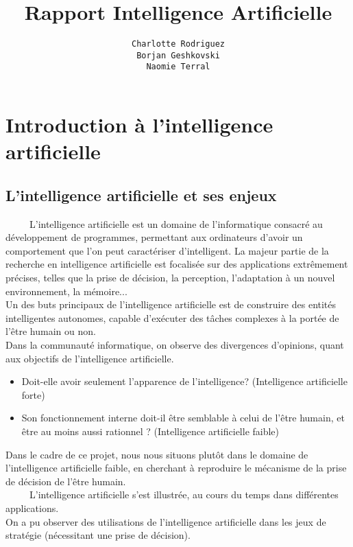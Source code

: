 \documentclass[a4paper,12pt]{report}
\begin{document}
\title{Rapport Intelligence Artificielle}

\author{\texttt{Charlotte Rodriguez}\\
		\texttt{Borjan Geshkovski}\\
		\texttt{Naomie Terral}
		}
\maketitle

\section{Introduction à l'intelligence artificielle}

\subsection{L'intelligence artificielle et ses enjeux}
\ \ \ \ \ L'intelligence artificielle est un domaine de l'informatique consacré au développement de programmes, permettant aux ordinateurs d'avoir un comportement que l'on peut caractériser d'intelligent. La majeur partie de la recherche en intelligence artificielle est focalisée sur des applications extrêmement précises, telles que la prise de décision, la perception, l'adaptation à un nouvel environnement, la mémoire... \\
Un des buts principaux de l'intelligence artificielle est de construire des entités intelligentes autonomes, capable d'exécuter des tâches complexes à la portée de l'être humain ou non. \\ 
Dans la communauté informatique, on observe des divergences d'opinions, quant aux objectifs de l'intelligence artificielle. 
\begin{itemize}
\item Doit-elle avoir seulement l'apparence de l'intelligence? (Intelligence artificielle forte)
\item Son fonctionnement interne doit-il être semblable à celui de l'être humain, et être au moins aussi rationnel ? (Intelligence artificielle faible)
\end{itemize}
Dans le cadre de ce projet, nous nous situons plutôt dans le domaine de l'intelligence artificielle faible, en cherchant à reproduire le mécanisme de la prise de décision de l'être humain. \\
\ \ \ \ \ L'intelligence artificielle s'est illustrée, au cours du temps dans différentes applications. \\
On a pu observer des utilisations de l'intelligence artificielle dans les jeux de stratégie (nécessitant une prise de décision).
\end{document}
